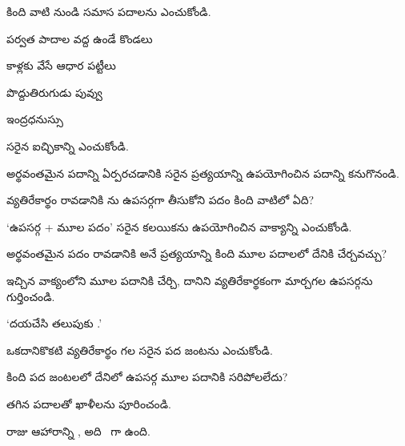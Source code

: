 \begin{questions}
 కింది వాటి నుండి సమాస పదాలను  ఎంచుకోండి.\par
{} పర్వత పాదాల వద్ద ఉండే కొండలు \par
{} కాళ్లకు వేసే ఆధార పట్టీలు \par
{} పొద్దుతిరుగుడు పువ్వు \par
{} ఇంద్రధనుస్సు \par
సరైన ఐచ్ఛికాన్ని ఎంచుకోండి.

 అర్థవంతమైన పదాన్ని ఏర్పరచడానికి సరైన ప్రత్యయాన్ని  ఉపయోగించిన పదాన్ని కనుగొనండి.

 వ్యతిరేకార్థం రావడానికి  ను ఉపసర్గగా  తీసుకోని పదం కింది వాటిలో ఏది?

 ‘ఉపసర్గ + మూల పదం’  సరైన కలయికను ఉపయోగించిన వాక్యాన్ని ఎంచుకోండి.

 అర్థవంతమైన పదం రావడానికి  అనే ప్రత్యయాన్ని  కింది మూల పదాలలో  దేనికి చేర్చవచ్చు?

 ఇచ్చిన వాక్యంలోని మూల పదానికి  చేర్చి, దానిని వ్యతిరేకార్థకంగా మార్చగల ఉపసర్గను  గుర్తించండి.\par
‘దయచేసి తలుపుకు .’

 ఒకదానికొకటి వ్యతిరేకార్థం గల సరైన పద జంటను ఎంచుకోండి.

 కింది పద జంటలలో దేనిలో ఉపసర్గ  మూల పదానికి  సరిపోలలేదు?

 తగిన పదాలతో ఖాళీలను పూరించండి.\par
రాజు ఆహారాన్ని \blank, అది \blank\ గా ఉంది.


\end{questions}
